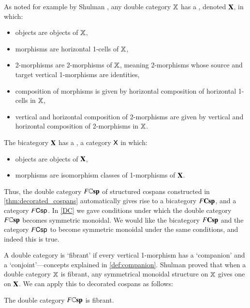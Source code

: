 \documentclass[reqno]{amsart}
\begin{document}
As noted for example by Shulman \cite{Shulman2010}, any double category $\mathbf{\mathbb X}$ has a 
, denoted $\mathbf{X}$, in which:
\begin{itemize}
\item objects are objects of $\mathbf{\mathbb X}$,
\item morphisms are horizontal 1-cells of $\mathbf{\mathbb X}$,
\item 2-morphisms are  2-morphisms of $\mathbf{\mathbb X}$, meaning 2-morphisms whose source and target vertical 1-morphisms are identities,
\item composition of morphisms is given by horizontal composition of horizontal 1-cells in $\mathbf{\mathbb X}$,
\item vertical and horizontal composition of 2-morphisms are given by vertical and horizontal
composition of 2-morphisms in $\mathbf{\mathbb X}$.
\end{itemize}
The bicategory $\mathbf{X}$ has a , a category $\mathsf{X}$ in which:
\begin{itemize}
\item objects are objects of $\mathbf{X}$,
\item morphisms are isomorphism classes of 1-morphisms of $\mathbf{X}$.   
\end{itemize}
Thus, the double category $F\mathbf{\mathbb Csp}$ of structured cospans constructed in \cref{thm:decorated_cospans} automatically gives rise to a bicategory $F\mathbf{Csp}$, and a category $F\mathsf{Csp}$.   In \cref{DC} we gave conditions under which the double category $F\mathbf{\mathbb Csp}$ becomes symmetric monoidal.   We would like the bicategory $F\mathbf{Csp}$ and the category $F\mathsf{Csp}$ to become symmetric monoidal under the same conditions, and indeed this is true.   

A double category is `fibrant' if every vertical 1-morphism has a `companion' and a `conjoint'---concepts explained in \cref{def:companion}.   Shulman \cite[Thm.\ 1.2]{Shulman2010} proved that when a double category $\mathbf{\mathbb X}$ is fibrant, any symmetrical monoidal structure on $\mathbf{\mathbb X}$ gives one on $\mathbf{X}$.    We can apply this to decorated cospans as follows:

\begin{lem}
The double category $F\mathbf{\mathbb Csp}$ is fibrant.
\end{lem}
\end{document}
